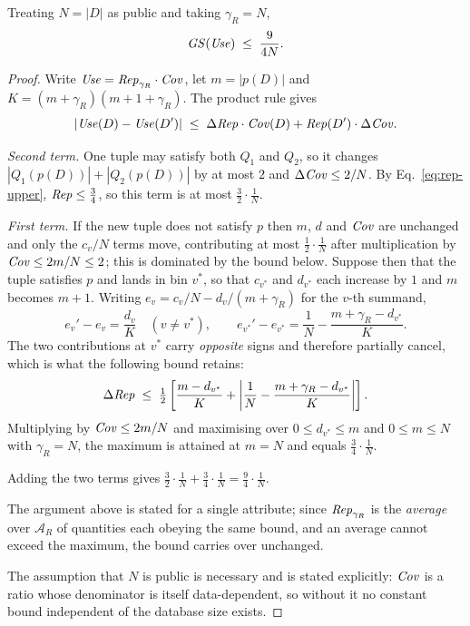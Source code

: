 \begin{proposition}
\label{prop:usefulness-sensitivity}
Treating $N=|D|$ as public and taking $\gamma_R=N$,
\[
\mathit{GS}(\mathit{Use})\;\le\;\frac{9}{4N}.
\]
\end{proposition}

\begin{proof}
Write $\mathit{Use}=\mathit{Rep}_{\gamma_R}\cdot\mathit{Cov}$, let $m=|p(D)|$ and $K=(m+\gamma_R)(m+1+\gamma_R)$.
The product rule gives
\begin{equation}
|\mathit{Use}(D)-\mathit{Use}(D')| \;\le\; \Delta\mathit{Rep}\cdot\mathit{Cov}(D) + \mathit{Rep}(D')\cdot\Delta\mathit{Cov} .
\label{eq:usefulness-product-rule}
\end{equation}

\emph{Second term.} One tuple may satisfy both $Q_1$ and $Q_2$, so it changes $|Q_1(p(D))|+|Q_2(p(D))|$ by at most $2$ and $\Delta\mathit{Cov}\le 2/N$.
By Eq.~\eqref{eq:rep-upper}, $\mathit{Rep}\le\tfrac34$, so this term is at most $\tfrac32\cdot\tfrac1N$.

\emph{First term.} If the new tuple does not satisfy $p$ then $m$, $d$ and $\mathit{Cov}$ are unchanged and only the $c_v/N$ terms move, contributing at most $\tfrac12\cdot\tfrac1N$ after multiplication by $\mathit{Cov}\le 2m/N\le2$; this is dominated by the bound below.
Suppose then that the tuple satisfies $p$ and lands in bin $v^*$, so that $c_{v^*}$ and $d_{v^*}$ each increase by $1$ and $m$ becomes $m+1$.
Writing $e_v=c_v/N-d_v/(m+\gamma_R)$ for the $v$-th summand,
\[
e_v'-e_v=\frac{d_v}{K}\quad(v\ne v^*),
\qquad
e_{v^*}'-e_{v^*}=\frac1N-\frac{m+\gamma_R-d_{v^*}}{K}.
\]
The two contributions at $v^*$ carry \emph{opposite} signs and therefore partially cancel, which is what the following bound retains:
\[
\Delta\mathit{Rep}\;\le\;\tfrac12\left[\frac{m-d_{v^*}}{K}+\left|\frac1N-\frac{m+\gamma_R-d_{v^*}}{K}\right|\right].
\]
Multiplying by $\mathit{Cov}\le 2m/N$ and maximising over $0\le d_{v^*}\le m$ and $0\le m\le N$ with $\gamma_R=N$, the maximum is attained at $m=N$ and equals $\tfrac34\cdot\tfrac1N$.

Adding the two terms gives $\tfrac32\cdot\tfrac1N+\tfrac34\cdot\tfrac1N=\tfrac94\cdot\tfrac1N$.

The argument above is stated for a single attribute; since $\mathit{Rep}_{\gamma_R}$ is the \emph{average} over $\mathcal{A}_R$ of quantities each obeying the same bound, and an average cannot exceed the maximum, the bound carries over unchanged.

The assumption that $N$ is public is necessary and is stated explicitly: $\mathit{Cov}$ is a ratio whose denominator is itself data-dependent, so without it no constant bound independent of the database size exists.
\end{proof}

